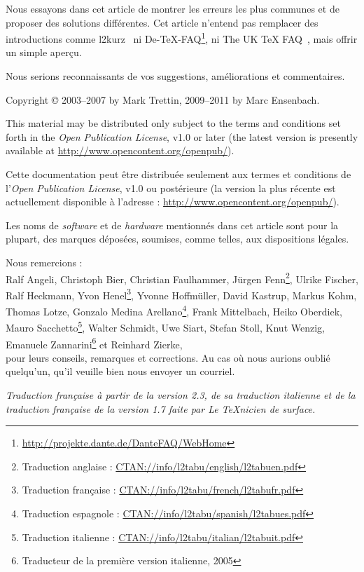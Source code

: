 \documentclass[fontsize=11pt, paper=a4, pagesize, captions=tableheading, numbers=enddot, toc=graduated, footnotes=multiple]{scrartcl}%
\newcommand{\Doku}[1]{\textsf{#1}\xspace}
\begin{document}
\begin{titlepage}
\begin{center}
\begin{minipage}{.9\linewidth}
Nous essayons dans cet article de montrer les erreurs les plus communes et de proposer des solutions différentes. Cet article n’entend pas remplacer des introductions comme \Doku{l2kurz}~\cite{l2kurz-12} ni \Doku{De-TeX-FAQ}\footnote{\url{http://projekte.dante.de/DanteFAQ/WebHome}}, ni \Doku{The UK \TeX{} FAQ}~\cite{ukfaq-13}, mais offrir un simple aperçu.

Nous serions reconnaissants de vos suggestions, améliorations et commentaires.
    \end{minipage}
  \end{center}
  \vfill
\end{titlepage}

{\setlength{\parindent}{0pt}
Copyright \copyright{} 2003--2007 by Mark Trettin, 2009--2011 by Marc Ensenbach. \medskip

This material may be distributed only subject to the terms and conditions set forth in the \emph{Open Publication License}, v1.0 or later (the latest version is presently available at \url{http://www.opencontent.org/openpub/}).
\medskip

Cette documentation peut être distribuée seulement aux termes et conditions de l’\emph{Open Publication License}, v1.0 ou postérieure (la version la plus récente est actuellement disponible à l’adresse : \url{http://www.opencontent.org/openpub/}).
\medskip

Les noms de \emph{software} et de \emph{hardware} mentionnés dans cet article sont pour la plupart, des marques déposées, soumises, comme telles, aux dispositions légales.
\vfill

Nous remercions : \\
Ralf Angeli,
Christoph Bier,
Christian Faulhammer,
Jürgen Fenn\footnote{Traduction anglaise : \url{CTAN://info/l2tabu/english/l2tabuen.pdf}},
Ulrike Fischer,
Ralf Heckmann,
Yvon Henel\footnote{Traduction française : \url{CTAN://info/l2tabu/french/l2tabufr.pdf}},
Yvonne Hoffmüller,
David Kastrup,
Markus Kohm,
Thomas Lotze,
Gonzalo Medina Arellano\footnote{Traduction espagnole : \url{CTAN://info/l2tabu/spanish/l2tabues.pdf}},
Frank Mittelbach,
Heiko Oberdiek,
Mauro Sacchetto\footnote{Traduction italienne : \url{CTAN://info/l2tabu/italian/l2tabuit.pdf}},
Walter Schmidt,
Uwe Siart,
Stefan Stoll,
Knut Wenzig,
Emanuele Zannarini\footnote{Traducteur de la première version italienne, 2005}
et Reinhard Zierke, \\
pour leurs conseils, remarques et corrections. Au cas où nous aurions oublié quelqu’un, qu’il veuille bien nous envoyer un courriel. \medskip

\emph{Traduction française à partir de la version 2.3, de sa traduction italienne et de la traduction française de la version 1.7 faite par Le \TeX nicien de surface. }
}
\end{document}
